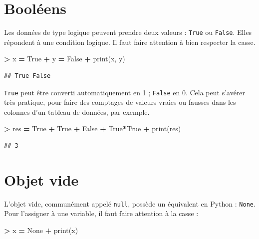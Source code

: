 \documentclass[12pt,]{book}
\newenvironment{Shaded}{\begin{snugshade}}{\end{snugshade}}
\newcommand{\VariableTok}[1]{\textcolor[rgb]{0.00,0.00,0.00}{#1}}
\newcommand{\OperatorTok}[1]{\textcolor[rgb]{0.81,0.36,0.00}{\textbf{#1}}}
\newcommand{\BuiltInTok}[1]{#1}
\newcommand{\NormalTok}[1]{#1}
\numberwithin{equation}{section}
\numberwithin{countremarque}{section}
\begin{document}
\section{Booléens}\label{booleens}

Les données de type logique peuvent prendre deux valeurs : \texttt{True}
ou \texttt{False}. Elles répondent à une condition logique. Il faut
faire attention à bien respecter la casse.

\begin{Shaded}
\begin{Highlighting}[]
\OperatorTok{>}\NormalTok{ x }\OperatorTok{=} \VariableTok{True}
\OperatorTok{+}\NormalTok{ y }\OperatorTok{=} \VariableTok{False}
\OperatorTok{+} \BuiltInTok{print}\NormalTok{(x, y)}
\end{Highlighting}
\end{Shaded}

\begin{lstlisting}
## True False
\end{lstlisting}

\texttt{True} peut être converti automatiquement en 1 ; \texttt{False}
en 0. Cela peut s'avérer très pratique, pour faire des comptages de
valeurs vraies ou fausses dans les colonnes d'un tableau de données, par
exemple.

\begin{Shaded}
\begin{Highlighting}[]
\OperatorTok{>}\NormalTok{ res }\OperatorTok{=} \VariableTok{True} \OperatorTok{+} \VariableTok{True} \OperatorTok{+} \VariableTok{False} \OperatorTok{+} \VariableTok{True}\OperatorTok{*}\VariableTok{True}
\OperatorTok{+} \BuiltInTok{print}\NormalTok{(res)}
\end{Highlighting}
\end{Shaded}

\begin{lstlisting}
## 3
\end{lstlisting}

\section{Objet vide}\label{objet-vide}

L'objet vide, communément appelé \texttt{null}, possède un équivalent en
Python : \texttt{None}. Pour l'assigner à une variable, il faut faire
attention à la casse :

\begin{Shaded}
\begin{Highlighting}[]
\OperatorTok{>}\NormalTok{ x }\OperatorTok{=} \VariableTok{None}
\OperatorTok{+} \BuiltInTok{print}\NormalTok{(x)}
\end{Highlighting}
\end{Shaded}
\end{document}

